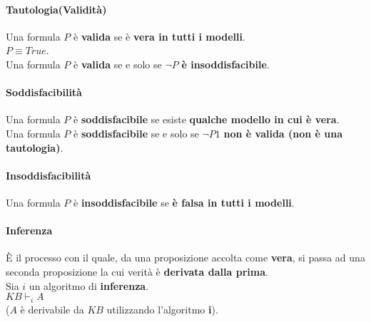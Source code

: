 \documentclass[14pt]{extarticle}
\begin{document}
\paragraph{Tautologia(Validità)}
Una formula $P$ è \textbf{valida} se è \textbf{vera in tutti i modelli}.\\
$P \equiv True$.\\
Una formula $P$ è \textbf{valida} se e solo se $\neg P$ \textbf{è insoddisfacibile}.
\paragraph{Soddisfacibilità}
Una formula $P$ è \textbf{soddisfacibile} se esiste \textbf{qualche modello in cui è vera}.\\
Una formula $P$ è \textbf{soddisfacibile} se e solo se $\neg P1$ \textbf{non è valida (non è una tautologia)}.
\paragraph{Insoddisfacibilità}
Una formula $P$ è \textbf{insoddisfacibile} se \textbf{è falsa in tutti i modelli}.
\paragraph{Inferenza}
È il processo con il quale, da una proposizione accolta come \textbf{vera}, si passa ad una seconda proposizione la cui verità è \textbf{derivata dalla prima}.\\
Sia $i$ un algoritmo di \textbf{inferenza}.\\
$KB \vdash_i A$\\
($A$ è derivabile da $KB$ utilizzando l'algoritmo \textbf{i}).
\end{document}
